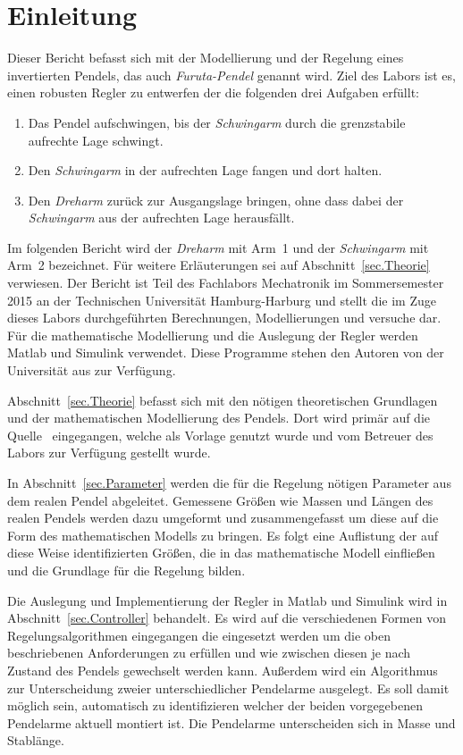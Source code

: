 \section{Einleitung}
\label{sec.Einleitung}

Dieser Bericht befasst sich mit der Modellierung und der Regelung eines invertierten Pendels, das auch \emph{Furuta-Pendel} genannt wird. 
Ziel des Labors ist es, einen robusten Regler zu entwerfen der die folgenden drei Aufgaben erfüllt:
\begin{enumerate}
	\raggedright
	\item Das Pendel aufschwingen, bis der \emph{Schwingarm} durch die grenzstabile aufrechte Lage schwingt.
	\item Den \emph{Schwingarm} in der aufrechten Lage fangen und dort halten.
	\item Den \emph{Dreharm} zurück zur Ausgangslage bringen, ohne dass dabei der \emph{Schwingarm} aus der aufrechten Lage herausfällt.
\end{enumerate}
Im folgenden Bericht wird der \emph{Dreharm} mit Arm~1 und der \emph{Schwingarm} mit Arm~2 bezeichnet.
Für weitere Erläuterungen sei auf Abschnitt~\ref{sec.Theorie} verwiesen.
Der Bericht ist Teil des Fachlabors Mechatronik im Sommersemester 2015 an der Technischen Universität Hamburg-Harburg und stellt die im Zuge dieses Labors durchgeführten Berechnungen, Modellierungen und versuche dar. 
Für die mathematische Modellierung und die Auslegung der Regler werden Matlab und Simulink verwendet.
Diese Programme stehen den Autoren von der Universität aus zur Verfügung.

Abschnitt~\ref{sec.Theorie} befasst sich mit den nötigen theoretischen Grundlagen und der mathematischen Modellierung des Pendels.
Dort wird primär auf die Quelle~\citep{Cazzolato.2011} eingegangen, welche als Vorlage genutzt wurde und vom Betreuer des Labors zur Verfügung gestellt wurde.

In Abschnitt~\ref{sec.Parameter} werden die für die Regelung nötigen Parameter aus dem realen Pendel abgeleitet. 
Gemessene Größen wie Massen und Längen des realen Pendels werden dazu umgeformt und zusammengefasst um diese auf die Form des mathematischen Modells zu bringen.
Es folgt eine Auflistung der auf diese Weise identifizierten Größen, die in das mathematische Modell einfließen und die Grundlage für die Regelung bilden.

Die Auslegung und Implementierung der Regler in Matlab und Simulink wird in Abschnitt~\ref{sec.Controller} behandelt.
Es wird auf die verschiedenen Formen von Regelungsalgorithmen eingegangen die eingesetzt werden um die oben beschriebenen Anforderungen zu erfüllen und wie zwischen diesen je nach Zustand des Pendels gewechselt werden kann.
Außerdem wird ein Algorithmus zur Unterscheidung zweier unterschiedlicher Pendelarme ausgelegt. 
Es soll damit möglich sein, automatisch zu identifizieren welcher der beiden vorgegebenen Pendelarme aktuell montiert ist. 
Die Pendelarme unterscheiden sich in Masse und Stablänge.

